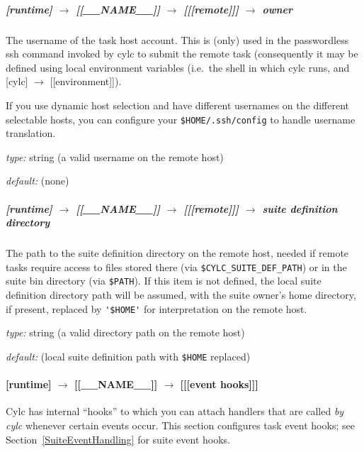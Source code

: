 \subparagraph[owner]{[runtime] $\rightarrow$ [[\_\_NAME\_\_]] $\rightarrow$ [[[remote]]] $\rightarrow$ owner}

The username of the task host account. This is (only) used in the
passwordless ssh command invoked by cylc to submit the remote task
(consequently it may be defined using local environment variables
(i.e.\ the shell in which cylc runs, and [cylc] $\rightarrow$ [[environment]]).

If you use dynamic host selection and have different usernames on
the different selectable hosts, you can configure your
\lstinline=$HOME/.ssh/config= to handle username translation.

\begin{myitemize}
\item {\em type:} string (a valid username on the remote host)
\item {\em default:} (none)
\end{myitemize}

\subparagraph[suite definition directory]{[runtime] $\rightarrow$ [[\_\_NAME\_\_]] $\rightarrow$ [[[remote]]] $\rightarrow$  suite definition directory}

The path to the suite definition directory on the remote host, needed if
remote tasks require access to files stored there (via
\lstinline=$CYLC_SUITE_DEF_PATH=) or in the suite bin directory (via
\lstinline=$PATH=).  If this item is not defined, the local suite
definition directory path will be assumed, with the suite owner's home
directory, if present, replaced by \lstinline='$HOME'= for
interpretation on the remote host.

\begin{myitemize}
\item {\em type:} string (a valid directory path on the remote host)
\item {\em default:} (local suite definition path with \lstinline=$HOME=
    replaced)
\end{myitemize}


\paragraph[{[[[}event hooks{]]]}]{[runtime] $\rightarrow$ [[\_\_NAME\_\_]] $\rightarrow$ [[[event hooks]]]}
\label{TaskEventHandling}

Cylc has internal ``hooks'' to which you can attach handlers that are
called {\em by cylc} whenever certain events occur. This section
configures task event hooks; see Section~\ref{SuiteEventHandling} for
suite event hooks.

